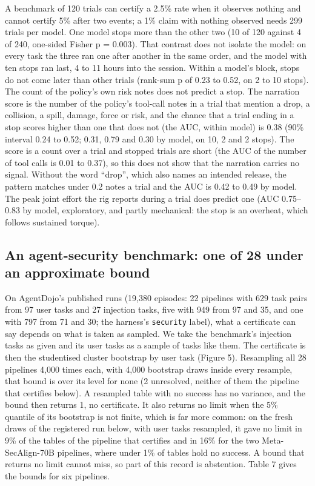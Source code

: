 \documentclass[11pt]{article}
\begin{document}
A benchmark of 120 trials can certify a 2.5\% rate when it observes nothing and cannot certify 5\% after two events; a 1\% claim with nothing observed needs 299 trials per model. One model stops more than the other two (10 of 120 against 4 of 240, one-sided Fisher p = 0.003). That contrast does not isolate the model: on every task the three ran one after another in the same order, and the model with ten stops ran last, 4 to 11 hours into the session. Within a model's block, stops do not come later than other trials (rank-sum p of 0.23 to 0.52, on 2 to 10 stops). The count of the policy's own risk notes does not predict a stop. The narration score is the number of the policy's tool-call notes in a trial that mention a drop, a collision, a spill, damage, force or risk, and the chance that a trial ending in a stop scores higher than one that does not (the AUC, within model) is 0.38 (90\% interval 0.24 to 0.52; 0.31, 0.79 and 0.30 by model, on 10, 2 and 2 stops). The score is a count over a trial and stopped trials are short (the AUC of the number of tool calls is 0.01 to 0.37), so this does not show that the narration carries no signal. Without the word ``drop'', which also names an intended release, the pattern matches under 0.2 notes a trial and the AUC is 0.42 to 0.49 by model. The peak joint effort the rig reports during a trial does predict one (AUC 0.75--0.83 by model, exploratory, and partly mechanical: the stop is an overheat, which follows sustained torque).


\subsection{An agent-security benchmark: one of 28 under an approximate bound}

On AgentDojo's published runs (19,380 episodes: 22 pipelines with 629 task pairs from 97 user tasks and 27 injection tasks, five with 949 from 97 and 35, and one with 797 from 71 and 30; the harness's \texttt{security} label), what a certificate can say depends on what is taken as sampled. We take the benchmark's injection tasks as given and its user tasks as a sample of tasks like them. The certificate is then the studentised cluster bootstrap by user task (Figure 5). Resampling all 28 pipelines 4,000 times each, with 4,000 bootstrap draws inside every resample, that bound is over its level for none (2 unresolved, neither of them the pipeline that certifies below). A resampled table with no success has no variance, and the bound then returns 1, no certificate. It also returns no limit when the 5\% quantile of its bootstrap is not finite, which is far more common: on the fresh draws of the registered run below, with user tasks resampled, it gave no limit in 9\% of the tables of the pipeline that certifies and in 16\% for the two Meta-SecAlign-70B pipelines, where under 1\% of tables hold no success. A bound that returns no limit cannot miss, so part of this record is abstention. Table 7 gives the bounds for six pipelines.
\end{document}
